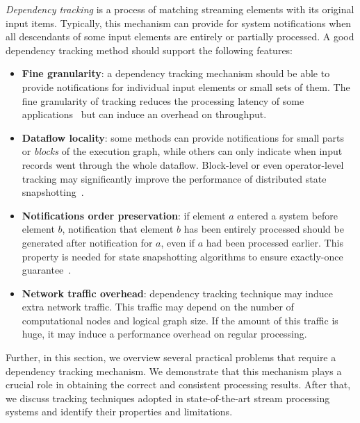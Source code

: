 {\em Dependency tracking} is a process of matching streaming elements with its original input items. Typically, this mechanism can provide for system notifications when all descendants of some input elements are entirely or partially processed. A good dependency tracking method should support the following features:
\begin{itemize}
    \item {\bf Fine granularity}: a dependency tracking mechanism should be able to provide notifications for individual input elements or small sets of them. The fine granularity of tracking reduces the processing latency of some applications~\cite{we2018adbis} but can induce an overhead on throughput.
    \item {\bf Dataflow locality}: some methods can provide notifications for small parts or {\em blocks} of the execution graph, while others can only indicate when input records went through the whole dataflow. Block-level or even operator-level tracking may significantly improve the performance of distributed state snapshotting~\cite{Carbone:2017:SMA:3137765.3137777, 2015arXiv150608603C}.
    \item {\bf Notifications order preservation}: if element $a$ entered a system before element $b$, notification that element $b$ has been entirely processed should be generated after notification for $a$, even if $a$ had been processed earlier. This property is needed for state snapshotting algorithms to ensure exactly-once guarantee~\cite{2015arXiv150608603C}.
    \item {\bf Network traffic overhead}: dependency tracking technique may induce extra network traffic. This traffic may depend on the number of computational nodes and logical graph size. If the amount of this traffic is huge, it may induce a performance overhead on regular processing.
\end{itemize}

Further, in this section, we overview several practical problems that require a dependency tracking mechanism. We demonstrate that this mechanism plays a crucial role in obtaining the correct and consistent processing results. After that, we discuss tracking techniques adopted in state-of-the-art stream processing systems and identify their properties and limitations. 

